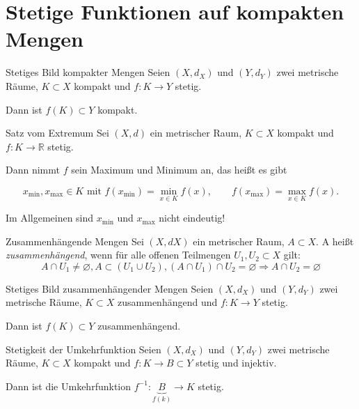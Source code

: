 \newpage
\section{Stetige Funktionen auf kompakten Mengen}
\label{3.3}

\begin{satz}{Stetiges Bild kompakter Mengen}
    Seien $(X,d_X)$ und $(Y,d_Y)$ zwei metrische Räume, $K\subset X$ kompakt und $f:K\to Y$ stetig.

    Dann ist $f(K)\subset Y$ kompakt.    
\end{satz}

\begin{satz}{Satz vom Extremum}
    Sei $(X,d)$ ein metrischer Raum, $K\subset X$ kompakt und $f:K\to\mathbb{R}$ stetig.

    \vspace{1ex}

    Dann nimmt $f$ sein Maximum und Minimum an, das heißt es gibt

    \vspace{1ex}

    $$
    x_{\min},x_{\max}\in K\text{ mit }
    f(x_{\min})=\min_{x\in K} f(x),\qquad
    f(x_{\max})=\max_{x\in K} f(x).
    $$

    \vspace{1ex}

    Im Allgemeinen sind $x_{\min}$ und $x_{\max}$ nicht eindeutig!   
\end{satz}

\begin{definition}{Zusammenhängende Mengen}
    Sei $(X, dX)$ ein metrischer Raum, $A \subset X$. A heißt \emph{zusammenhängend}, wenn für alle offenen Teilmengen
    $U_1, U_2 \subset X$ gilt:
    $$
        A \cap U_1 \neq \varnothing, A \subset (U_1 \cup U_2), (A \cap U_1) \cap U_2 = \varnothing \Rightarrow A \cap U_2 = \varnothing
    $$
\end{definition}

\begin{satz}{Stetiges Bild zusammenhängender Mengen}
    Seien $(X,d_X)$ und $(Y,d_Y)$ zwei metrische Räume, $K\subset X$ zusammenhängend und $f:K\to Y$ stetig.

    Dann ist $f(K)\subset Y$ zusammenhängend.
\end{satz}

\begin{satz}{Stetigkeit der Umkehrfunktion}
    Seien $(X,d_X)$ und $(Y,d_Y)$ zwei metrische Räume, $K\subset X$ kompakt und $f\colon K\to B\subset Y$ stetig und injektiv.

    Dann ist die Umkehrfunktion $f^{-1}\colon \underbrace{B}_{f(k)}\to K$ stetig.
\end{satz}

